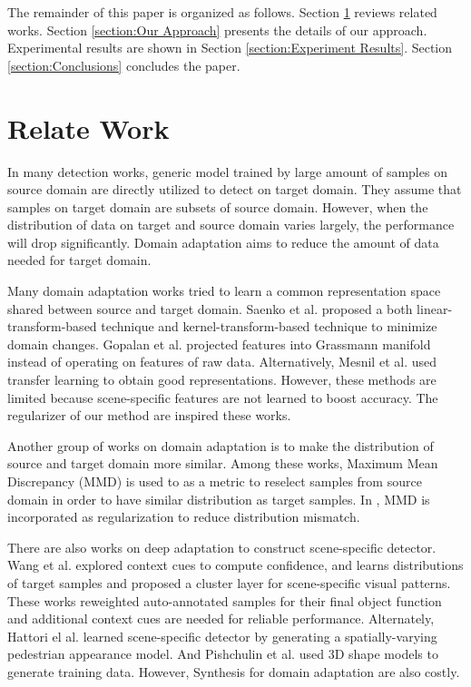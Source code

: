 \documentclass[runningheads]{llncs}
\begin{document}
The remainder of this paper is organized as follows. Section \ref{section:Relate Work} reviews related works. Section \ref{section:Our Approach} presents the details of our approach. Experimental results are shown in Section \ref{section:Experiment Results}. Section \ref{section:Conclusions} concludes the paper.

\section{Relate Work}
\label{section:Relate Work}

In many detection works, generic model trained by large amount of samples on source domain are directly utilized to detect on target domain. They assume that samples on target domain are subsets of source domain. However, when the distribution of data on target and source domain varies largely, the performance will drop significantly. Domain adaptation aims to reduce the amount of data needed for target domain.

Many domain adaptation works tried to learn a common representation space shared between source and target domain. Saenko et al. \cite{saenko2010adapting,kulis2011you} proposed a both linear-transform-based technique and kernel-transform-based technique to minimize domain changes. Gopalan et al. \cite{gopalan2011domain} projected features into Grassmann manifold instead of operating on features of raw data. Alternatively, Mesnil et al. \cite{mesnil2012unsupervised} used transfer learning to obtain good representations. However, these methods are limited because scene-specific features are not learned to boost accuracy. The regularizer of our method are inspired these works.

Another group of works \cite{huang2006correcting,gretton2009covariate,gong2013connecting} on domain adaptation is to make the distribution of source and target domain more similar. Among these works, Maximum Mean Discrepancy (MMD) is used to as a metric to reselect samples from source domain in order to have similar distribution as target samples. In \cite{ghifary2014domain}, MMD is incorporated as regularization to reduce distribution mismatch.

There are also works on deep adaptation to construct scene-specific detector. Wang et al.\cite{wang2014scene} explored context cues to compute confidence, and \cite{zeng2014deep} learns distributions of target samples and proposed a cluster layer for scene-specific visual patterns. These works reweighted auto-annotated samples for their final object function and additional context cues are needed for reliable performance. Alternately, Hattori el al. \cite{hattori2015learning} learned scene-specific detector by generating a spatially-varying pedestrian appearance model. And Pishchulin et al. \cite{pishchulin2011learning} used 3D shape models to generate training data. However, Synthesis for domain adaptation are also costly.
\end{document}

